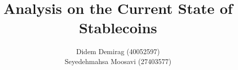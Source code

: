 \documentclass[envcountsect]{llncs}
\begin{document}
\frontmatter
\mainmatter

\title{Analysis on the Current State of Stablecoins}
\author{Didem Demirag (40052597) \\ Seyedehmahsa Moosavi (27403577)}




\maketitle











\clearpage
\end{document}

